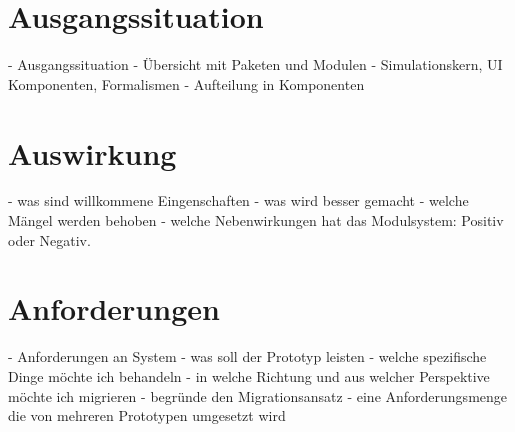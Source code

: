 \section{Ausgangssituation} \label{sec:ausgangssituation}
	- Ausgangssituation
		- Übersicht mit Paketen und Modulen 
		- Simulationskern, UI Komponenten, Formalismen   
	- Aufteilung in Komponenten 

\section{Auswirkung} \label{auswirkung}
	- was sind willkommene Eingenschaften 
	- was wird besser gemacht 
	- welche Mängel werden behoben 
	- welche Nebenwirkungen hat das Modulsystem: Positiv oder Negativ. 

\section{Anforderungen} \label{sec:anforderungen}
- Anforderungen an System 
	- was soll der Prototyp leisten 
	- welche spezifische Dinge möchte ich behandeln 
	- in welche Richtung und aus welcher Perspektive möchte ich migrieren 
	- begründe den Migrationsansatz 
	- eine Anforderungsmenge die von mehreren Prototypen umgesetzt wird 






